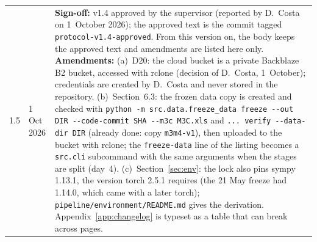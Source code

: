 \documentclass[11pt,a4paper]{article}
\newcommand{\code}[1]{\texttt{#1}}
\begin{document}
\begin{longtable}{@{}p{1.3cm} p{1.9cm} p{11.8cm}@{}}
1.5 & 1 Oct 2026 & \textbf{Sign-off:} v1.4 approved by the supervisor (reported by D.\ Costa on 1~October 2026); the approved text is the commit tagged \code{protocol-v1.4-approved}. From this version on, the body keeps the approved text and amendments are listed here only. \textbf{Amendments:} (a)~D20: the cloud bucket is a private Backblaze B2 bucket, accessed with rclone (decision of D.\ Costa, 1~October); credentials are created by D.\ Costa and never stored in the repository. (b)~Section~6.3: the frozen data copy is created and checked with \code{python -m src.data.freeze_data freeze -{}-out DIR -{}-code-commit SHA -{}-m3c M3C.xls} and \code{... verify -{}-data-dir DIR} (already done: copy \code{m3m4-v1}), then uploaded to the bucket with rclone; the \code{freeze-data} line of the listing becomes a \code{src.cli} subcommand with the same arguments when the stages are split (day~4). (c)~Section~\ref{sec:env}: the lock also pins sympy 1.13.1, the version torch 2.5.1 requires (the 21 May freeze had 1.14.0, which came with a later torch); \code{pipeline/environment/README.md} gives the derivation. Appendix~\ref{app:changelog} is typeset as a table that can break across pages. \\

\end{longtable}
\end{document}
